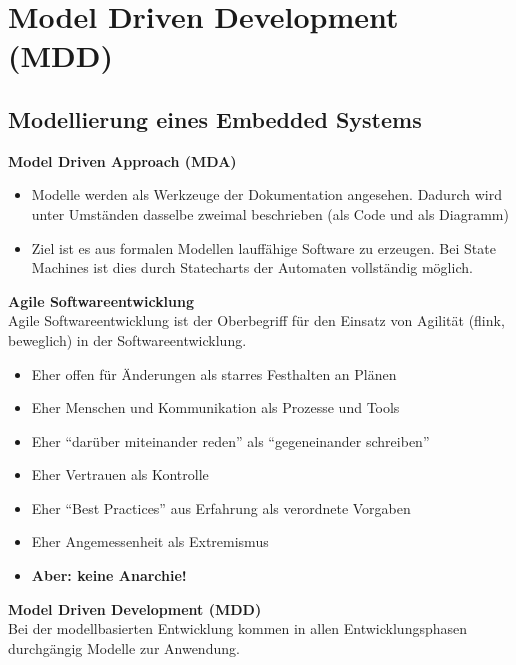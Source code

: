 \section{Model Driven Development (MDD)}
\subsection{Modellierung eines Embedded Systems}

\textbf{Model Driven Approach (MDA)}
\begin{itemize}
	\item Modelle werden als Werkzeuge der Dokumentation angesehen. Dadurch wird unter Umständen dasselbe zweimal beschrieben (als Code und als Diagramm)

	\item Ziel ist es aus formalen Modellen lauffähige Software zu erzeugen. Bei State Machines ist dies durch Statecharts der Automaten vollständig möglich.
\end{itemize}

\textbf{Agile Softwareentwicklung}\\
Agile Softwareentwicklung ist der Oberbegriff für den Einsatz von Agilität (flink, beweglich) in der Softwareentwicklung.
\begin{itemize}
	\item Eher offen für Änderungen als starres Festhalten an Plänen
	\item Eher Menschen und Kommunikation als Prozesse und Tools
	\item Eher "`darüber miteinander reden"' als "`gegeneinander schreiben"'
	\item Eher Vertrauen als Kontrolle
	\item Eher "`Best Practices"' aus Erfahrung als verordnete Vorgaben
	\item Eher Angemessenheit als Extremismus
	\item \textbf{Aber: keine Anarchie!}
\end{itemize}

\textbf{Model Driven Development (MDD)}\\
Bei der modellbasierten Entwicklung kommen in allen Entwicklungsphasen durchgängig Modelle zur Anwendung.


